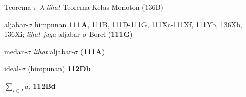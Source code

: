 Teorema $\pi$-$\lambda$ {\it lihat} Teorema Kelas Monoton (136B)

\indexmedskip





\indexmedskip
\indexheader{$\scriptstyle\pmb{\sigma}$}







aljabar-$\sigma$ himpunan {\bf 111A}, 111B,
111D-111G, 
111Xc-111Xf, 
111Yb, 136Xb, 136Xi; 
  {\it lihat juga}
aljabar-$\sigma$ Borel ({\bf 111G})
















medan-$\sigma$ {\it lihat} aljabar-$\sigma$ ({\bf 111A})















{ideal-$\sigma$ }
(himpunan) {\bf 112Db}

























\indexmedskip
\indexheader{$\scriptstyle\pmb{\Sigma}$}







$\sum_{i\in I}a_i$ {\bf 112Bd}





































